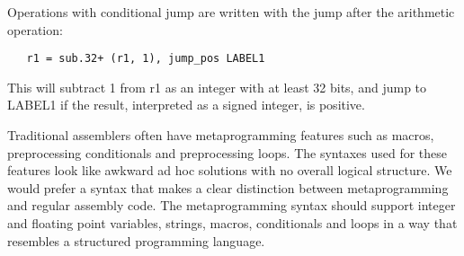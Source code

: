 \documentclass[forwardcom.tex]{subfiles}
\begin{document}
\vspace{2mm}
Operations with conditional jump are written with the jump after the arithmetic operation:
\begin{lstlisting}
   r1 = sub.32+ (r1, 1), jump_pos LABEL1
\end{lstlisting}
This will subtract 1 from r1 as an integer with at least 32 bits, and jump to LABEL1 if the result, interpreted as a signed integer, is positive.

\vspace{2mm}
Traditional assemblers often have metaprogramming features such as macros, preprocessing conditionals and preprocessing loops. The syntaxes used for these features look like awkward ad hoc solutions with no overall logical structure. We would prefer a syntax that makes a clear distinction between metaprogramming and regular assembly code. The metaprogramming syntax should support integer and floating point variables, strings, macros, conditionals and loops in a way that resembles a structured programming language. 
\end{document}
